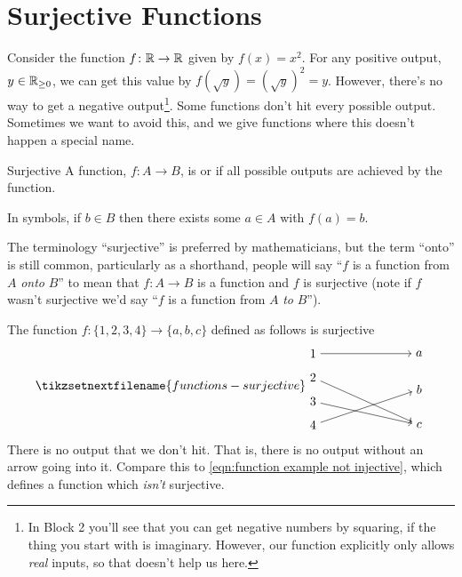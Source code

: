 \documentclass[fleqn]{LectureClass/LectureClass}
\begin{document}
    \section{Surjective Functions}
    Consider the function \(f \colon \mathbb{R} \to \mathbb{R}\) given by \(f(x) = x^2\).
    For any positive output, \(y \in \mathbb{R}_{\ge0}\), we can get this value by \(f(\sqrt{y}) = (\sqrt{y})^2 = y\).
    However, there's no way to get a negative output\footnote{In Block 2 you'll see that you can get negative numbers by squaring, if the thing you start with is imaginary. However, our function explicitly only allows \emph{real} inputs, so that doesn't help us here.}.
    Some functions don't hit every possible output.
    Sometimes we want to avoid this, and we give functions where this doesn't happen a special name.
    
    \begin{dfn}{Surjective}{}
        A function, \(f \colon A \to B\), is  or  if all possible outputs are achieved by the function.
        
        In symbols, if \(b \in B\) then there exists some \(a \in A\) with \(f(a) = b\).
    \end{dfn}
    
    The terminology \enquote{surjective} is preferred by mathematicians, but the term \enquote{onto} is still common, particularly as a shorthand, people will say \enquote{\(f\) is a function from \(A\) \emph{onto} \(B\)} to mean that \(f \colon A \to B\) is a function and \(f\) is surjective (note if \(f\) wasn't surjective we'd say \enquote{\(f\) is a function from \(A\) \emph{to} \(B\)}).
    
    \begin{exm}{}{}
        The function \(f \colon \{1, 2, 3, 4\} \to \{a, b, c\}\) defined as follows is surjective
        \begin{equation}
            \tikzsetnextfilename{functions-surjective}
            \begin{tikzpicture}[baseline=(current bounding box)]
                \node (a) at (3, 2) {\(a\)};
                \node (b) at (3, 1) {\(b\)};
                \node (c) at (3, 0) {\(c\)};
                \node (n1) at (0, 2) {\(1\)};
                \node (n2) at (0, 1.33) {\(2\)};
                \node (n3) at (0, 0.66) {\(3\)};
                \node (n4) at (0, 0) {\(4\)};
                \draw [->] (n1) -- (a);
                \draw [->] (n2) -- (c);
                \draw [->] (n3) -- (c);
                \draw [->] (n4) -- (b);
            \end{tikzpicture}
        \end{equation}
        There is no output that we don't hit.
        That is, there is no output without an arrow going into it.
        Compare this to \cref{eqn:function example not injective}, which defines a function which \emph{isn't} surjective.
    \end{exm}
    
\end{document}
